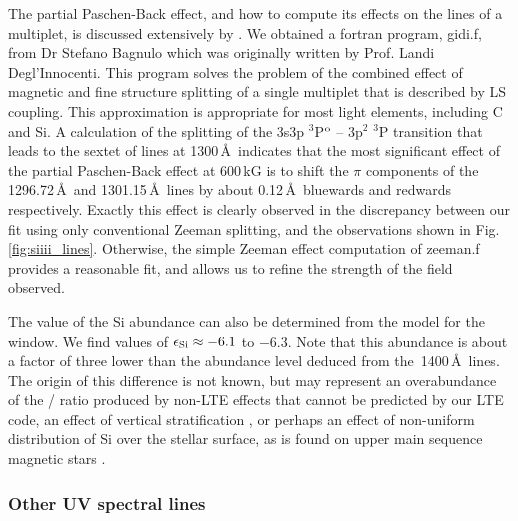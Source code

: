 \documentclass[fleqn,usenatbib]{mnras}
\begin{document}
The partial Paschen-Back effect, and how to compute its effects on the lines of a multiplet, is discussed extensively by \citet[][Sec. 3.4]{landideglinnocenti+landolfi04-1}. We obtained a {\sc fortran} program, {\sc gidi.f}, from Dr Stefano Bagnulo which was originally written by Prof. Landi Degl'Innocenti. This program solves the problem of the combined effect of magnetic and fine structure splitting of a single multiplet that is described by LS coupling. This approximation is appropriate for most light elements, including C and Si. A calculation of the splitting of the 3s3p $^3$P$^{\rm o}$ -- 3p$^2$ $^3$P transition that leads to the sextet of lines at 1300\,\AA\ indicates that the most significant effect of the partial Paschen-Back effect at 600\,kG is to shift the $\pi$ components of the 1296.72\,\AA\ and 1301.15\,\AA\ lines by about 0.12\,\AA\ bluewards and redwards respectively. Exactly this effect is clearly observed in the discrepancy between our fit using only conventional Zeeman splitting, and the observations shown in Fig.\,\ref{fig:siiii_lines}. Otherwise, the simple Zeeman effect computation of {\sc zeeman.f} provides a reasonable fit, and allows us to refine the strength of the field observed.



The value of the Si abundance  can also be determined from the model for the  window.  We find values of $\epsilon_{\rm Si} \approx -6.1$ to $-6.3$. Note that this abundance is about a factor of three lower than the abundance level deduced from the \,1400\,\AA\ lines. The origin of this difference is not known, but may represent an overabundance of the / ratio produced by non-LTE effects that cannot be predicted by our LTE code, an effect of vertical stratification \citep{koesteretal14-1}, or perhaps an effect of non-uniform distribution of Si over the stellar surface, as is found on upper main sequence magnetic stars \citep[see for e.g.][]{krtickaetal19-1}.

\subsubsection{Other UV spectral lines}
\end{document}
